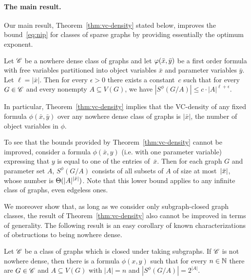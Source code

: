 \paragraph{The main result.}
Our main result, Theorem~\ref{thm:vc-density} stated below, improves the bound~\eqref{eq:nip} for classes of sparse graphs
by providing essentially the optimum exponent.

 \begin{theorem}\label{thm:vc-density}
Let $\mathscr{C}$ be a nowhere dense class of graphs and let $\varphi(\bar{x},\bar{y})$ be a first order formula
with free variables  partitioned  into object variables $\bar x$  and parameter variables $\bar y$. Let $\ell=|\bar x|$. Then 
for every $\epsilon>0$ 
there exists a constant~$c$ such that for every $G\in \mathscr{C}$ and every nonempty
$A\subseteq V(G)$, we have $|S^\phi(G/A)|\leq c\cdot |A|^{\ell+\epsilon}.$
 \end{theorem}

In particular, Theorem~\ref{thm:vc-density} implies that
the VC-density of any fixed formula 
$\phi(\bar x,\bar y)$ over any nowhere dense class of graphs is $|\bar x|$, the number of object variables in $\phi$.

To see that the bounds provided by Theorem~\ref{thm:vc-density} cannot be improved, consider a formula $\phi(\bar x,y)$ (i.e. with one parameter variable) expressing that $y$ is equal to one of the entries of~$\bar x$. Then for each graph $G$ and parameter set $A$, $S^{\phi}(G/A)$ consists of all subsets of $A$ of size at most~$|\bar{x}|$, whose number is $\Theta(|A|^{|\bar{x}|})$. Note that
this lower bound applies to any infinite class of graphs, even edgeless ones.

We moreover show that, as long as we consider only subgraph-closed graph classes, the result of Theorem~\ref{thm:vc-density} also cannot be improved in terms of generality.
The following result is an easy corollary of known characterizations of obstructions to being nowhere dense.

   \begin{theorem}\label{thm:vc-density-lower-bound}
  Let $\mathscr{C}$ be a class of graphs which 
  is closed under taking subgraphs. 
   If $\mathscr{C}$ is not nowhere dense, then there is a formula 
  $\phi(x,y)$ such that for every $n\in \mathbb{N}$ there are $G\in\mathscr{C}$ and $A\subseteq V(G)$ 
  with $|A|=n$ and $|S^\phi(G/A)|=2^{|A|}$. 
\end{theorem}

